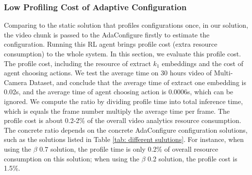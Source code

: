 \subsubsection{Low Profiling Cost of Adaptive Configuration}
\label{subsec: profile cost}
Comparing to the static solution that profiles configurations once, in our solution, the video
chunk is passed to the AdaConfigure firstly to estimate the configuration. Running this RL agent brings profile cost (extra resource consumption) to the whole system. In this section, we evaluate this profile cost. 
The profile cost, including the resource of extract $k_1$ embeddings and the cost of agent choosing actions. We test the average time on 30 hours video of Multi-Camera Dataset, and conclude that the average time of extract one embedding is 0.02s, and the average time of agent choosing action is 0.0006s, which can be ignored. We compute the ratio by dividing profile time into total inference time, which is equals the frame number multiply the average time per frame. The profile cost is about 0.2-2\% of the overall video analytics resource consumption. The concrete ratio depends on the concrete AdaConfigure configuration solutions, such as the solutions listed in Table \ref{tab: different sulutions}. For instance, when using the $\beta$ 0.7 solution, the profile time is only 0.2\% of overall resource consumption on this solution; when using the $\beta$ 0.2 solution, the profile cost is 1.5\%.        


